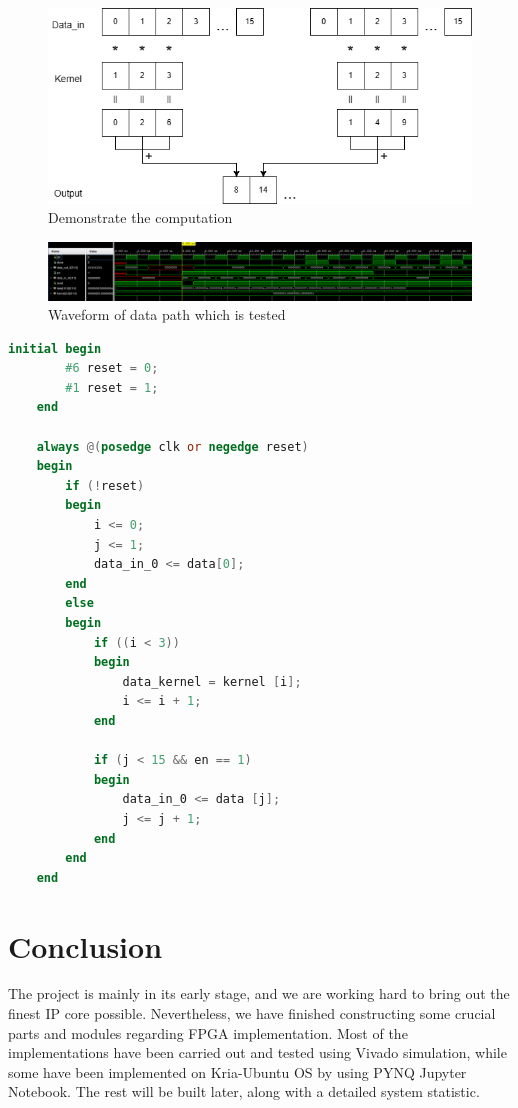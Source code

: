 \documentclass[a4paper, 12pt]{report}
\begin{document}
\begin{figure}[H]
    \centering
    \includegraphics[width = 12cm]{picture/result/computingcore/convo_dataflow-Page-4.drawio.png}
    \caption{Demonstrate the computation}
    \medskip
\end{figure}

\begin{figure}[H]
    \centering
    \includegraphics[width = 18cm]{picture/result/computingcore/computingcoretb.png}
    \caption{Waveform of data path which is tested}
    \medskip
\end{figure}
\begin{lstlisting}[language= verilog]  
    initial begin
        #6 reset = 0;
        #1 reset = 1;
    end
    
    always @(posedge clk or negedge reset)
    begin
        if (!reset)
        begin
            i <= 0;
            j <= 1;
            data_in_0 <= data[0];
        end
        else
        begin
            if ((i < 3))
            begin
                data_kernel = kernel [i];
                i <= i + 1;
            end
            
            if (j < 15 && en == 1)
            begin
                data_in_0 <= data [j];
                j <= j + 1;
            end
        end
    end
\end{lstlisting}

\chapter{Conclusion}
The project is mainly in its early stage, and we are working hard to bring out the finest IP core possible. Nevertheless, we have finished constructing some crucial parts and modules regarding FPGA implementation. Most of the implementations have been carried out and tested using Vivado simulation, while some have been implemented on Kria-Ubuntu OS by using PYNQ Jupyter Notebook. The rest will be built later, along with a detailed system statistic.
\end{document}
